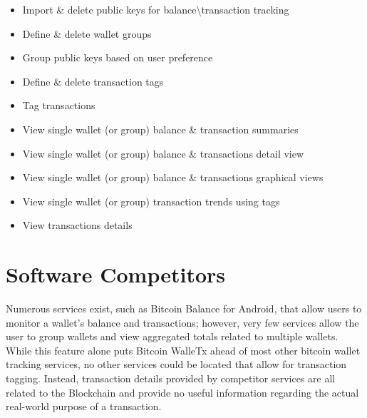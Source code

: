 \documentclass[12pt]{article}
\begin{document}
  \begin{adjustwidth}{1.5em}{0pt}
    \begin{itemize}
      \item Import \& delete public keys for balance\textbackslash{transaction} tracking
      \item Define \& delete wallet groups
      \item Group public keys based on user preference
      \item Define \& delete transaction tags
      \item Tag transactions
      \item View single wallet (or group) balance \& transaction summaries
      \item View single wallet (or group) balance \& transactions detail view
      \item View single wallet (or group) balance \& transactions graphical views
      \item View single wallet (or group) transaction trends using tags
      \item View transactions details

    \end{itemize}
  \end{adjustwidth}

  \section{Software Competitors}
  \begin{adjustwidth}{1.5em}{0pt}

  \normalsize{Numerous services exist, such as Bitcoin Balance for Android, that allow users to monitor a wallet's balance and transactions; however, very few services allow the user to
  group wallets and view aggregated totals related to multiple wallets. While this feature alone puts Bitcoin WalleTx ahead of most other bitcoin wallet tracking services, no other 
  services could be located that allow for transaction tagging. Instead, transaction details provided by competitor services are all related to the Blockchain and provide no useful 
  information regarding the actual real-world purpose of a transaction. }\\ 
  \end{adjustwidth}
\end{document}

